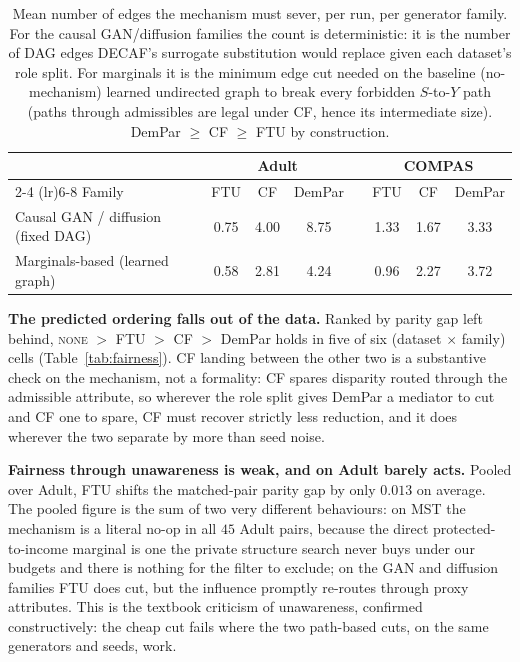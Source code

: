 \documentclass{article}
\begin{document}
\begin{table}[t]
  \caption{Mean number of edges the mechanism must sever, per run, per
  generator family. For the causal GAN/diffusion families the count is
  deterministic: it is the number of DAG edges DECAF's surrogate
  substitution would replace given each dataset's role split. For marginals
  it is the minimum edge cut needed on the baseline (no-mechanism) learned
  undirected graph to break every forbidden $S$-to-$Y$ path (paths through
  admissibles are legal under CF, hence its intermediate size). DemPar
  $\geq$ CF $\geq$ FTU by construction.}
  \label{tab:edges}
  \centering
  \footnotesize
  \setlength{\tabcolsep}{6pt}
  \begin{tabular}{l ccc c ccc}
    \toprule
    & \multicolumn{3}{c}{\textbf{Adult}} & & \multicolumn{3}{c}{\textbf{COMPAS}} \\
    \cmidrule(lr){2-4} \cmidrule(lr){6-8}
    Family & FTU & CF & DemPar & & FTU & CF & DemPar \\
    \midrule
    Causal GAN / diffusion (fixed DAG) & 0.75 & 4.00 & 8.75 & & 1.33 & 1.67 & 3.33 \\
    Marginals-based (learned graph)   & 0.58 & 2.81 & 4.24 & & 0.96 & 2.27 & 3.72 \\
    \bottomrule
  \end{tabular}
\end{table}

\textbf{The predicted ordering falls out of the data.} Ranked by parity gap
left behind, \textsc{none} $>$ FTU $>$ CF $>$ DemPar holds in five of six
(dataset $\times$ family) cells (Table~\ref{tab:fairness}). CF landing
between the other two is a substantive check on the mechanism, not a
formality: CF spares disparity routed through the admissible attribute, so
wherever the role split gives DemPar a mediator to cut and CF one to spare,
CF must recover strictly less reduction, and it does wherever the two
separate by more than seed noise.

\textbf{Fairness through unawareness is weak, and on Adult barely acts.}
Pooled over Adult, FTU shifts the matched-pair parity gap by only $0.013$
on average. The pooled figure is the sum of two very different behaviours:
on MST the mechanism is a literal no-op in all $45$ Adult pairs, because
the direct protected-to-income marginal is one the private structure search
never buys under our budgets and there is nothing for the filter to
exclude; on the GAN and diffusion families FTU does cut, but the influence
promptly re-routes through proxy attributes. This is the textbook criticism
of unawareness, confirmed constructively: the cheap cut fails where the two
path-based cuts, on the same generators and seeds, work.
\end{document}
